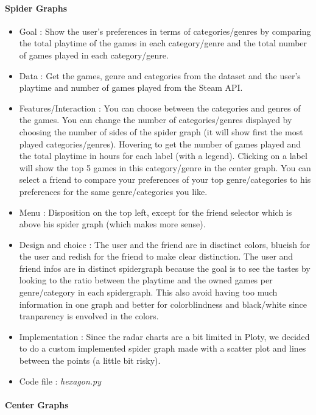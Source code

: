 \documentclass{article}
\begin{document}
	\paragraph{Spider Graphs}
	
	\begin{itemize}
		\item Goal : Show the user's preferences in terms of categories/genres by comparing the total playtime of the games in each category/genre and the total number of games played in each category/genre.
		\item Data : Get the games, genre and categories from the dataset and the user's playtime and number of games played from the Steam API.
		\item Features/Interaction : You can choose between the categories and genres of the games. You can change the number of categories/genres displayed by choosing the number of sides of the spider graph (it will show first the most played categories/genres). Hovering to get the number of games played and the total playtime in hours for each label (with a legend). Clicking on a label will show the top 5 games in this category/genre in the center graph. You can select a friend to compare your preferences of your top genre/categories to his preferences for the same genre/categories you like.
		\item Menu : Disposition on the top left, except for the friend selector which is above his spider graph (which makes more sense).
		\item Design and choice : The user and the friend are in disctinct colors, blueish for the user and redish for the friend to make clear distinction. The user and friend infos are in distinct spidergraph because the goal is to see the tastes by looking to the ratio between the playtime and the owned games per genre/category in each spidergraph. This also avoid having too much information in one graph and better for colorblindness and black/white since tranparency is envolved in the colors.
		\item Implementation : Since the radar charts are a bit limited in Ploty, we decided to do a custom implemented spider graph made with a scatter plot and lines between the points (a little bit risky).
		\item Code file : \textit{hexagon.py}
	\end{itemize}

	\paragraph{Center Graphs}
	
\end{document}
